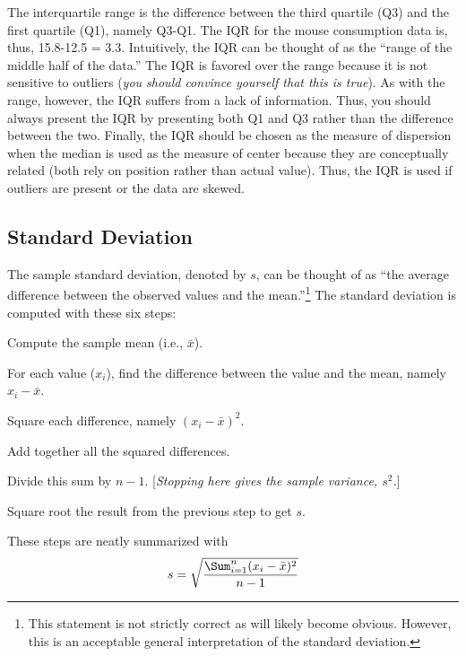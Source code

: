 \documentclass[10pt,openany]{book}\usepackage[]{graphicx}\usepackage[]{color}
\begin{document}

The interquartile range is the difference between the third quartile (Q3) and the first quartile (Q1), namely Q3-Q1.  The IQR for the mouse consumption data is, thus, 15.8-12.5 = 3.3.  Intuitively, the IQR can be thought of as the ``range of the middle half of the data.''  The IQR is favored over the range because it is not sensitive to outliers (\textit{you should convince yourself that this is true}).  As with the range, however, the IQR suffers from a lack of information.  Thus, you should always present the IQR by presenting both Q1 and Q3 rather than the difference between the two.  Finally, the IQR should be chosen as the measure of dispersion when the median is used as the measure of center because they are conceptually related (both rely on position rather than actual value).  Thus, the IQR is used if outliers are present or the data are skewed.


\vspace{-12pt}

\subsection{Standard Deviation}\label{sect:StdDev}
The sample standard deviation, denoted by $s$, can be thought of as ``the average difference between the observed values and the mean.''\footnote{This statement is not strictly correct as will likely become obvious.  However, this is an acceptable general interpretation of the standard deviation.}  The standard deviation is computed with these six steps:
\begin{Enumerate}
  \item Compute the sample mean (i.e., $\bar{x}$).
  \item For each value ($x_{i}$), find the difference between the value and the mean, namely $x_{i}-\bar{x}$.
  \item Square each difference, namely $(x_{i}-\bar{x})^{2}$.
  \item Add together all the squared differences.
  \item Divide this sum by $n-1$.  [\textit{Stopping here gives the sample variance, $s^{2}$.}]
  \item Square root the result from the previous step to get $s$.
\end{Enumerate}
These steps are neatly summarized with
\begin{equation}
  \label{eqn:SampleSD}
     s = \sqrt{\frac{\Sum_{i=1}^{n}(x_{i}-\bar{x})^{2}}{n-1}}
\end{equation}
\end{document}

